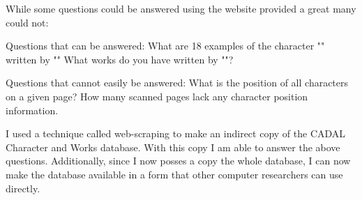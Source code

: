 While some questions could be answered using the website provided a great many could not:

    Questions that can be answered:
        What are 18 examples of the character "" written by ""
        What works do you have written by ""?
    
    Questions that cannot easily be answered:
        What is the position of all characters on a given page?
        How many scanned pages lack any character position information.


I used a technique called web-scraping to make an indirect copy of the CADAL Character and Works database.  With this copy I am able to answer the above questions.  Additionally, since I now posses a copy the whole database, I can now make the database available in a form that other computer researchers can use directly.







